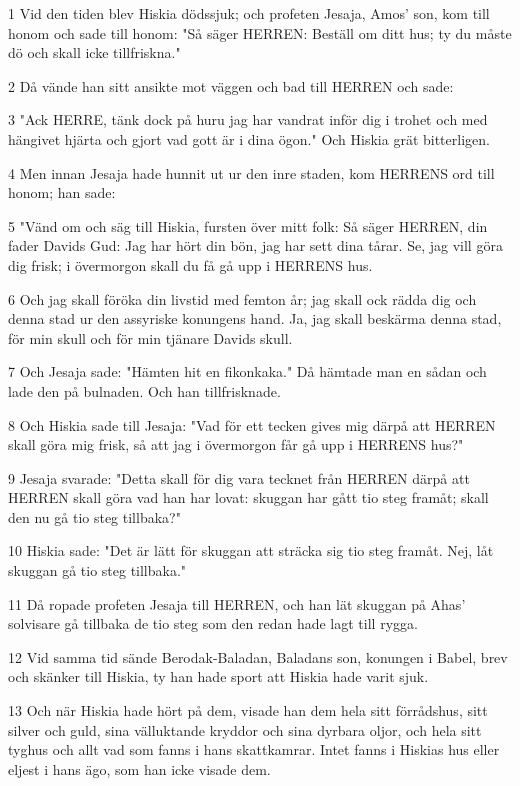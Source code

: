 \par 1 Vid den tiden blev Hiskia dödssjuk; och profeten Jesaja, Amos' son, kom till honom och sade till honom: "Så säger HERREN: Beställ om ditt hus; ty du måste dö och skall icke tillfriskna."
\par 2 Då vände han sitt ansikte mot väggen och bad till HERREN och sade:
\par 3 "Ack HERRE, tänk dock på huru jag har vandrat inför dig i trohet och med hängivet hjärta och gjort vad gott är i dina ögon." Och Hiskia grät bitterligen.
\par 4 Men innan Jesaja hade hunnit ut ur den inre staden, kom HERRENS ord till honom; han sade:
\par 5 "Vänd om och säg till Hiskia, fursten över mitt folk: Så säger HERREN, din fader Davids Gud: Jag har hört din bön, jag har sett dina tårar. Se, jag vill göra dig frisk; i övermorgon skall du få gå upp i HERRENS hus.
\par 6 Och jag skall föröka din livstid med femton år; jag skall ock rädda dig och denna stad ur den assyriske konungens hand. Ja, jag skall beskärma denna stad, för min skull och för min tjänare Davids skull.
\par 7 Och Jesaja sade: "Hämten hit en fikonkaka." Då hämtade man en sådan och lade den på bulnaden. Och han tillfrisknade.
\par 8 Och Hiskia sade till Jesaja: "Vad för ett tecken gives mig därpå att HERREN skall göra mig frisk, så att jag i övermorgon får gå upp i HERRENS hus?"
\par 9 Jesaja svarade: "Detta skall för dig vara tecknet från HERREN därpå att HERREN skall göra vad han har lovat: skuggan har gått tio steg framåt; skall den nu gå tio steg tillbaka?"
\par 10 Hiskia sade: "Det är lätt för skuggan att sträcka sig tio steg framåt. Nej, låt skuggan gå tio steg tillbaka."
\par 11 Då ropade profeten Jesaja till HERREN, och han lät skuggan på Ahas' solvisare gå tillbaka de tio steg som den redan hade lagt till rygga.
\par 12 Vid samma tid sände Berodak-Baladan, Baladans son, konungen i Babel, brev och skänker till Hiskia, ty han hade sport att Hiskia hade varit sjuk.
\par 13 Och när Hiskia hade hört på dem, visade han dem hela sitt förrådshus, sitt silver och guld, sina välluktande kryddor och sina dyrbara oljor, och hela sitt tyghus och allt vad som fanns i hans skattkamrar. Intet fanns i Hiskias hus eller eljest i hans ägo, som han icke visade dem.
